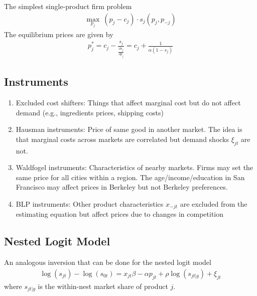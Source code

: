 \documentclass[11pt]{elegantbook}
\begin{document}
\begin{example}
    The simplest single-product firm problem
    \begin{equation}
        \begin{aligned}
            \max_{p_j}\ (p_j-c_j)\cdot s_j(p_j,p_{-j})
        \end{aligned}
        \nonumber
    \end{equation}
    The equilibrium prices are given by
    \begin{equation}
        \begin{aligned}
            p_j^*=c_j-\frac{s_j}{\frac{\partial s_j}{\partial p_j}}=c_j+\frac{1}{\alpha(1-s_j)}
        \end{aligned}
        \nonumber
    \end{equation}
\end{example}

\subsection{Instruments}
\begin{enumerate}
    \item Excluded cost shifters:
    \subitem Things that affect marginal cost but do not affect demand (e.g., ingredients prices, shipping costs)
    \item Hausman instruments:
    \subitem Price of same good in another market. The idea is that marginal costs across markets are correlated but demand shocks $\xi_{jt}$ are not.
    \item  Waldfogel instruments:
    \subitem Characteristics of nearby markets. Firms may set the same price for all cities within a region. The
    age/income/education in San Francisco may affect prices in Berkeley but not Berkeley preferences.
    \item BLP instruments:
    \subitem Other product characteristics $x_{-jt}$ are excluded from the estimating equation but affect prices due
    to changes in competition
\end{enumerate}

\subsection{Nested Logit Model}
An analogous inversion that can be done for the nested logit model
\begin{equation}
    \begin{aligned}
        \log(s_{jt})-\log(s_{0t})=x_{jt}\beta-\alpha p_{jt}+\rho\log\left(s_{jt|g}\right)+\xi_{jt}
    \end{aligned}
    \nonumber
\end{equation}
where $s_{jt|g}$ is the within-nest market share of product $j$.
\end{document}
